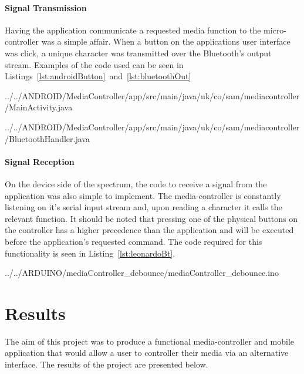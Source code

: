 \documentclass{article}
\begin{document}
			\paragraph{Signal Transmission}
			Having the application communicate a requested media function to the micro-controller was a simple affair. When a button on the applications user interface was click, a unique character was transmitted over the Bluetooth's output stream. Examples of the code used can be seen in Listings~\ref{lst:androidButton}~and~\ref{lst:bluetoothOut}
			
			 {../../ANDROID/MediaController/app/src/main/java/uk/co/sam/mediacontroller/MainActivity.java}
			
			 {../../ANDROID/MediaController/app/src/main/java/uk/co/sam/mediacontroller/BluetoothHandler.java}
			
			\paragraph{Signal Reception}
			On the device side of the spectrum, the code to receive a signal from the application was also simple to implement. The media-controller is constantly listening on it's serial input stream and, upon reading a character it calls the relevant function. It should be noted that pressing one of the physical buttons on the controller has a higher precedence than the application and will be executed before the application's requested command. The code required for this functionality is seen in Listing~\ref{lst:leonardoBt}.
			
			 {../../ARDUINO/mediaController_debounce/mediaController_debounce.ino}
			
	\newpage
			
	\section{Results}
	The aim of this project was to produce a functional media-controller and mobile application that would allow a user to controller their media via an alternative interface. The results of the  project are presented below.
		
\end{document}

